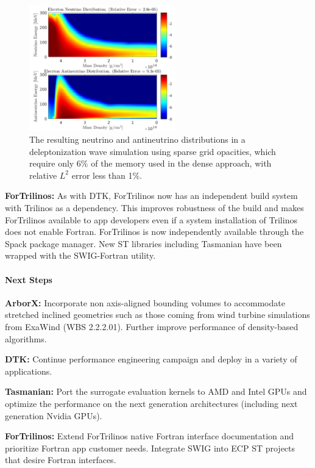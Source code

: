 \begin{figure}[htb]
        \centering
        \includegraphics[width=2.5in]{projects/2.3.3-MathLibs/2.3.3.14-ALExa-ForTrilinos/tasmanian_exastar}
\caption{\label{fig:tasmanian-exastar}
		The resulting neutrino and antineutrino distributions in a deleptonization
		wave simulation using sparse grid opacities, which require only 6\% of
		the memory used in the dense approach, with relative $L^2$ error less than 1\%.}
\end{figure}

{\bf ForTrilinos:}
As with DTK, ForTrilinos now has an independent build system with Trilinos as a
dependency. This improves robustness of the build and makes ForTrilinos
available to app developers even if a system installation of Trilinos does not
enable Fortran. ForTrilinos is now independently available through the Spack
package manager. New ST libraries including Tasmanian have been wrapped with the
SWIG-Fortran utility.


\paragraph{Next Steps}

\indent

{\bf ArborX:} Incorporate non axis-aligned bounding volumes to accommodate
stretched inclined geometries such as those coming from wind turbine
simulations from ExaWind (WBS 2.2.2.01). Further improve performance of
density-based algorithms.

{\bf DTK:} Continue performance engineering campaign and deploy in a variety of
applications.

{\bf Tasmanian:} Port the surrogate evaluation kernels to AMD and Intel
GPUs and optimize the performance on the next generation architectures
(including next generation Nvidia GPUs).

{\bf ForTrilinos:} Extend ForTrilinos native Fortran interface documentation and
prioritize Fortran app customer needs. Integrate SWIG into ECP ST projects that
desire Fortran interfaces.

